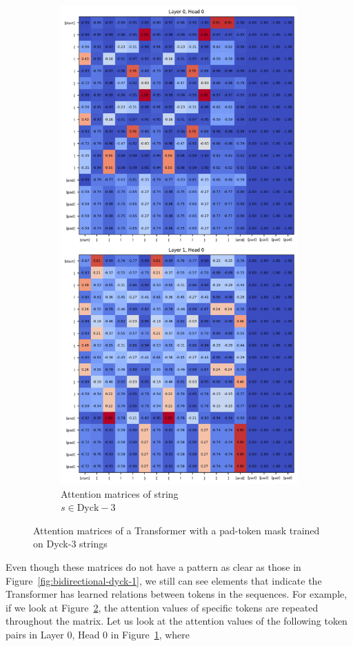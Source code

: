 \begin{figure}[h]
\begin{subfigure}{.5\textwidth}
      \includegraphics[width=.8\linewidth]{docs/figs/dyck_3/pad_tok_seq_2_dyck_3.png}
      \caption{Attention matrices of string \\ $s \in \text{Dyck}-3$}
      \label{fig:pos-dyck-3}
    \end{subfigure}
    \caption{Attention matrices of a Transformer with a pad-token mask trained on Dyck-3 strings}
    \label{fig:bidirectional-dyck-3}
\end{figure}

Even though these matrices do not have a pattern as clear as those in Figure~\ref{fig:bidirectional-dyck-1}, we still can see elements that indicate the Transformer has learned relations between tokens in the sequences. For example, if we look at Figure~\ref{fig:bidirectional-dyck-3}, the attention values of specific tokens are repeated throughout the matrix. Let us look at the attention values of the following token pairs in Layer 0, Head 0 in Figure~\ref{fig:pos-dyck-3}, where

